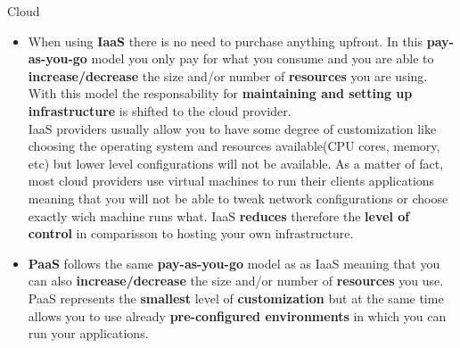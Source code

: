 \begin{pattern}{Cloud}
{\begin{itemize}
					\item When using \textbf{IaaS} there is no need to purchase anything upfront. In this \textbf{pay-as-you-go} model you only pay for what you consume and you are able to \textbf{increase/decrease} the size and/or number of \textbf{resources} you are using. With this model the responsability for \textbf{maintaining and setting up infrastructure} is shifted to the cloud provider. \\
					IaaS providers usually allow you to have some degree of customization  like choosing the operating system and resources available(CPU cores, memory, etc) but lower level configurations will not be available. As a matter of fact, most cloud providers use virtual machines to run their clients applications meaning that you will not be able to tweak network configurations or choose exactly wich machine runs what. IaaS \textbf{reduces} therefore the \textbf{level of control} in comparisson to hosting your own infrastructure.
					\item \textbf{PaaS} follows the same \textbf{pay-as-you-go} model as as IaaS meaning that you can also \textbf{increase/decrease} the size and/or number of \textbf{resources} you use. \\
					PaaS represents the \textbf{smallest} level of \textbf{customization} but at the same time allows you to use already \textbf{pre-configured environments } in which you can run your applications.
				\end{itemize}
			}
		\end{pattern}
